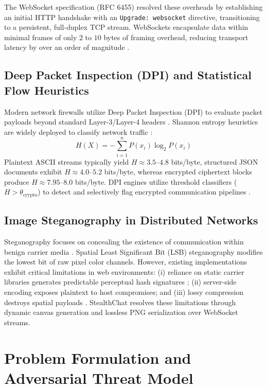 \documentclass[conference]{IEEEtran}
\begin{document}
The WebSocket specification (RFC 6455) resolved these overheads by establishing an initial HTTP handshake with an \texttt{Upgrade: websocket} directive, transitioning to a persistent, full-duplex TCP stream. WebSockets encapsulate data within minimal frames of only $2\text{ to }10$ bytes of framing overhead, reducing transport latency by over an order of magnitude \cite{fette2011websocket}.

\subsection{Deep Packet Inspection (DPI) and Statistical Flow Heuristics}
Modern network firewalls utilize Deep Packet Inspection (DPI) to evaluate packet payloads beyond standard Layer-3/Layer-4 headers \cite{dainotti2012issues}. Shannon entropy heuristics are widely deployed to classify network traffic \cite{shannon1949communication}:
\begin{equation}
    H(X) = -\sum_{i=1}^{n} P(x_i) \log_2 P(x_i)
\end{equation}
Plaintext ASCII streams typically yield $H \approx 3.5\text{--}4.8$ bits/byte, structured JSON documents exhibit $H \approx 4.0\text{--}5.2$ bits/byte, whereas encrypted ciphertext blocks produce $H \approx 7.95\text{--}8.0$ bits/byte. DPI engines utilize threshold classifiers ($H > \theta_{\text{crypto}}$) to detect and selectively flag encrypted communication pipelines \cite{lyda2007using}.

\subsection{Image Steganography in Distributed Networks}
Steganography focuses on concealing the existence of communication within benign carrier media \cite{fridrich2009steganography}. Spatial Least Significant Bit (LSB) steganography modifies the lowest bit of raw pixel color channels. However, existing implementations exhibit critical limitations in web environments: (i) reliance on static carrier libraries generates predictable perceptual hash signatures \cite{westfeld1999attacks}; (ii) server-side encoding exposes plaintext to host compromises; and (iii) lossy compression destroys spatial payloads \cite{cachin2004information}. StealthChat resolves these limitations through dynamic canvas generation and lossless PNG serialization over WebSocket streams.

\section{Problem Formulation and Adversarial Threat Model}
\end{document}
